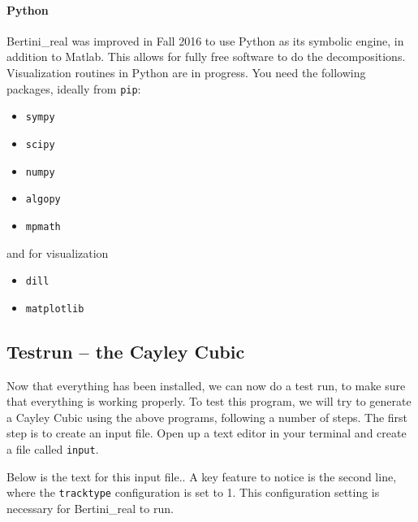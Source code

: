 \paragraph*{Python}

Bertini\_real was improved in Fall 2016 to use Python as its symbolic engine, in addition to Matlab.  This allows for fully free software to do the decompositions.  Visualization routines in Python are in progress.  You need the following packages, ideally from {\tt pip}:
\begin{itemize}[noitemsep]
\item {\tt sympy}
\item {\tt scipy}
\item {\tt numpy}
\item {\tt algopy}
\item {\tt mpmath}
  \end{itemize}
and for visualization
\begin{itemize}[noitemsep]
\item {\tt dill}
\item {\tt matplotlib}
  \end{itemize}






\clearpage


\clearpage


\clearpage















\clearpage

\subsection{Testrun -- the Cayley Cubic}

Now that everything has been installed, we can now do a test run, to make sure that everything is working properly. To test this program, we will try to generate a Cayley Cubic using the above programs, following a number of steps. The first step is to create an input file. Open up a text editor in your terminal and create a file called \texttt{input}. 

Below is the text for this input file.. A key feature to notice is the second line, where the \texttt{tracktype} configuration is set to 1. This configuration setting is necessary for Bertini\_real to run. 

